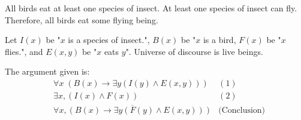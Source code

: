 \documentclass[]{article}
\begin{document}
\begin{question}{1.4}
All birds eat at least one species of insect. At least one species of insect can fly. Therefore, all birds
eat some flying being.

Let $I(x)$ be "$x$ is a species of insect.", $B(x)$ be "$x$ is a bird, $F(x)$ be "$x$ flies.", and $E(x,y)$ be "$x$ eats $y$". Universe of discourse is live beings.
\end{question}

The argument given is:
\begin{align*}
    & \forall x\;(B(x) \rightarrow \exists y(I(y) \land E(x, y))) & (1)\\
    & \exists x, (I(x) \land F(x)) & (2)\\
    & \overline{\forall x, (B(x) \rightarrow \exists y(F(y) \land E(x, y)))} & \text{(Conclusion)}
\end{align*}
\end{document}
